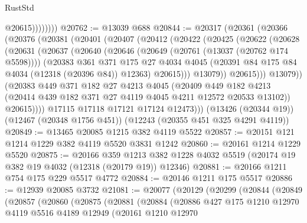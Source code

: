 \begin{lexlean}{RustStd}
\begin{coremodule}
                    @20615))))))))
@20762 := @13039 @688
@20844 := @20317
    (@20361
      (@20366
        (@20376
          (@20381
            (@20401
              (@20407
                (@20412
                  (@20422
                    (@20425
                      (@20622
                        (@20628
                          (@20631
                            (@20637
                              (@20640
                                (@20646
                                  (@20649 (@20761 (@13037 (@20762 @174 @5598))))
                                  (@20383
                                    @361
                                    @371
                                    @175
                                    @27
                                    @4034
                                    @4045
                                    (@20391 @84 @175 @84 @4034 (@12318 (@20396 @84)) @12363)
                                    @20615)))
                              @13079))
                          @20615)))
                    @13079))
                (@20383
                  @449
                  @371
                  @182
                  @27
                  @4213
                  @4045
                  (@20409
                    @449
                    @182
                    @4213
                    (@20414 @439 @182 @371 @27 @4119 @4045 @4211 @12572 @20533 @13102))
                  @20615))))
          @17115
          @17118
          @17121
          @17124
          @12473)))
    (@13426 (@20344 @19))
    (@12467 (@20348 @1756 @451))
    (@12243 (@20355 @451 @325 @4291 @4119))
@20849 := @13465 @20085 @1215 @382 @4119 @5522
@20857 := @20151 @121 @1214 @1229 @382 @4119 @5520 @3831 @1242
@20860 := @20161 @1214 @1229 @5520
@20875 := @20166
    @359
    @1213
    @382
    @1228
    @4032
    @5519
    (@20174 @19 @382 @19 @4032 (@12318 (@20179 @19)) @12346)
@20881 := @20166 @1211 @754 @175 @229 @5517 @4772
@20884 := @20146 @1211 @175 @5517
@20886 := @12939 @20085 @3732
@21081 := @20077
    (@20129
      (@20299
        (@20844
          (@20849
            (@20857
              (@20860
                (@20875
                  (@20881
                    (@20884
                      (@20886
                        @427
                        @175
                        @1210
                        @12970
                        @4119
                        @5516
                        @4189
                        @12949
                        (@20161
                          @1210
                          @12970

\end{coremodule}
\end{lexlean}
